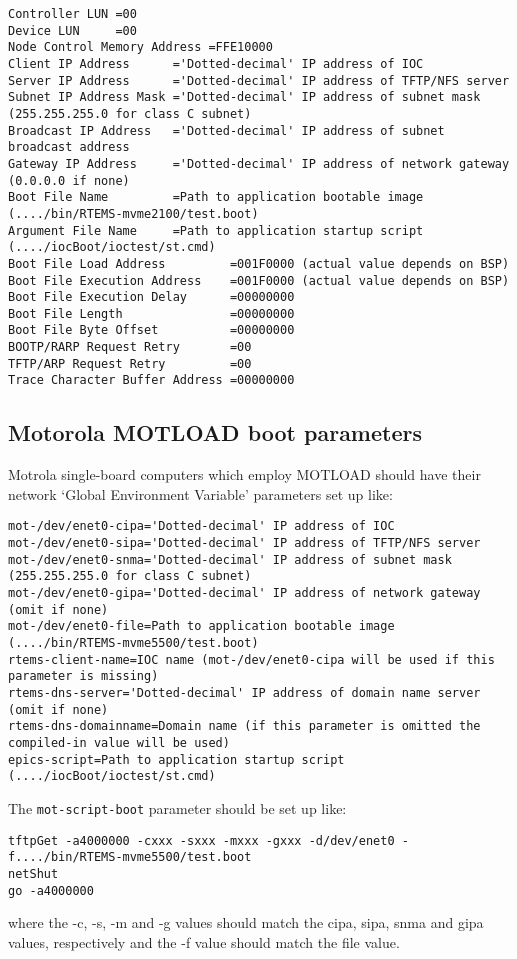\begin{verbatim}Controller LUN =00
Device LUN     =00
Node Control Memory Address =FFE10000
Client IP Address      ='Dotted-decimal' IP address of IOC
Server IP Address      ='Dotted-decimal' IP address of TFTP/NFS server
Subnet IP Address Mask ='Dotted-decimal' IP address of subnet mask (255.255.255.0 for class C subnet)
Broadcast IP Address   ='Dotted-decimal' IP address of subnet broadcast address
Gateway IP Address     ='Dotted-decimal' IP address of network gateway (0.0.0.0 if none)
Boot File Name         =Path to application bootable image (..../bin/RTEMS-mvme2100/test.boot)
Argument File Name     =Path to application startup script (..../iocBoot/ioctest/st.cmd)
Boot File Load Address         =001F0000 (actual value depends on BSP)
Boot File Execution Address    =001F0000 (actual value depends on BSP)
Boot File Execution Delay      =00000000
Boot File Length               =00000000
Boot File Byte Offset          =00000000
BOOTP/RARP Request Retry       =00
TFTP/ARP Request Retry         =00
Trace Character Buffer Address =00000000
\end{verbatim}\subsection{Motorola MOTLOAD boot parameters}

Motrola single-board computers which employ MOTLOAD should have their network `Global Environment Variable' 
parameters set up like:

\begin{verbatim}mot-/dev/enet0-cipa='Dotted-decimal' IP address of IOC
mot-/dev/enet0-sipa='Dotted-decimal' IP address of TFTP/NFS server
mot-/dev/enet0-snma='Dotted-decimal' IP address of subnet mask (255.255.255.0 for class C subnet)
mot-/dev/enet0-gipa='Dotted-decimal' IP address of network gateway (omit if none)
mot-/dev/enet0-file=Path to application bootable image (..../bin/RTEMS-mvme5500/test.boot)
rtems-client-name=IOC name (mot-/dev/enet0-cipa will be used if this parameter is missing)
rtems-dns-server='Dotted-decimal' IP address of domain name server (omit if none)
rtems-dns-domainname=Domain name (if this parameter is omitted the compiled-in value will be used)
epics-script=Path to application startup script (..../iocBoot/ioctest/st.cmd)
\end{verbatim}The \verb|mot-script-boot| parameter should be set up like:

\begin{verbatim}tftpGet -a4000000 -cxxx -sxxx -mxxx -gxxx -d/dev/enet0 -f..../bin/RTEMS-mvme5500/test.boot
netShut
go -a4000000
\end{verbatim}where the -c, -s, -m and -g values should match the cipa, sipa, snma and gipa values, respectively and the -f value should 
match the file value.

